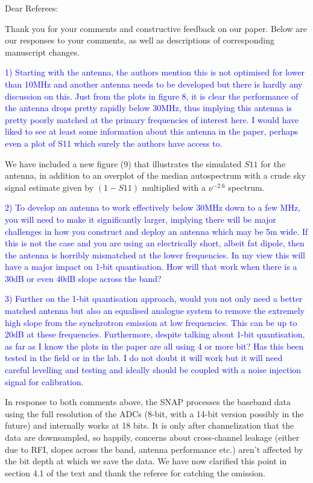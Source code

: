 \documentclass[11pt]{article}
\begin{document}
\noindent Dear Referees:

Thank you for your comments and constructive feedback on our paper.
Below are our responses to your comments, as well as descriptions of
corresponding manuscript changes.

\noindent \textcolor{blue}{1) Starting with the antenna, the authors
  mention this is not optimised for lower than 10MHz and another
  antenna needs to be developed but there is hardly any discussion on
  this. Just from the plots in figure 8, it is clear the performance
  of the antenna drops pretty rapidly below 30MHz, thus implying this
  antenna is pretty poorly matched at the primary frequencies of
  interest here. I would have liked to see at least some information
  about this antenna in the paper, perhaps even a plot of S11 which
  surely the authors have access to. }

We have included a new figure (9) that illustrates the simulated $S11$
for the antenna, in addition to an overplot of the median autospectrum
with a crude sky signal estimate given by $(1-S11)$ multiplied with a
$\nu^{-2.6}$ spectrum.

\noindent \textcolor{blue}{2) To develop an antenna to work
  effectively below 30MHz down to a few MHz, you will need to make it
  significantly larger, implying there will be major challenges in how
  you construct and deploy an antenna which may be 5m wide. If this is
  not the case and you are using an electrically short, albeit fat
  dipole, then the antenna is horribly mismatched at the lower
  frequencies. In my view this will have a major impact on 1-bit
  quantisation. How will that work when there is a 30dB or even 40dB
  slope across the band?}

\noindent \textcolor{blue}{3) Further on the 1-bit quantisation
  approach, would you not only need a better matched antenna but also
  an equalised analogue system to remove the extremely high slope from
  the synchrotron emission at low frequencies. This can be up to 20dB
  at these frequencies. Furthermore, despite talking about 1-bit
  quantisation, as far as I know the plots in the paper are all using
  4 or more bit? Has this been tested in the field or in the lab. I do
  not doubt it will work but it will need careful levelling and
  testing and ideally should be coupled with a noise injection signal
  for calibration.}

In response to both comments above, the SNAP processes the baseband
data using the full resolution of the ADCs (8-bit, with a 14-bit
version possibly in the future) and internally works at 18 bits.  It
is only after channelization that the data are downsampled, so
happily, concerns about cross-channel leakage (either due to RFI,
slopes across the band, antenna performance etc.) aren't affected by
the bit depth at which we save the data.  We have now clarified this
point in section 4.1 of the text and thank the referee for catching
the omission.
\end{document}

